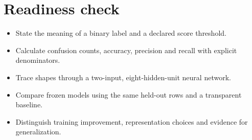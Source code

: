 \documentclass[11pt,letterpaper]{article}
\theoremstyle{definition}\newtheorem{definition}{Definition}\newtheorem{example}{Example}
\numberwithin{equation}{section}
\begin{document}
\section*{Readiness check}
\begin{itemize}
\item State the meaning of a binary label and a declared score threshold.
\item Calculate confusion counts, accuracy, precision and recall with explicit denominators.
\item Trace shapes through a two-input, eight-hidden-unit neural network.
\item Compare frozen models using the same held-out rows and a transparent baseline.
\item Distinguish training improvement, representation choices and evidence for generalization.
\end{itemize}
\end{document}
